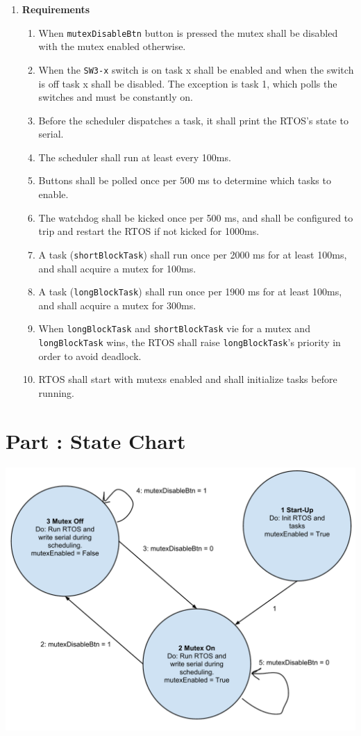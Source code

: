 \documentclass{article}
\newcounter{partNum}
\newcommand{\partNum}{%
        \stepcounter{partNum}%
        \thepartNum}
\newcommand{\sectPart}[1]{\section*{Part \partNum: #1}}
\newcommand{\bitem}[1]{\item \textbf{#1}}
\begin{document}
\begin{enumerate}
\bitem{Requirements}
	\begin{enumerate}
	\item When \texttt{mutexDisableBtn} button is pressed the mutex shall be disabled with the mutex enabled otherwise.
	\item When the \texttt{SW3-x} switch is on task x shall be enabled and when the switch is off task x shall be disabled. The exception is task 1, which polls the switches and must be constantly on.
	\item Before the scheduler dispatches a task, it shall print the RTOS's state to serial.
	\item The scheduler shall run at least every 100ms.
	\item Buttons shall be polled once per 500 ms to determine which tasks to enable.
	\item The watchdog shall be kicked once per 500 ms, and shall be configured to trip and restart the RTOS if not kicked for 1000ms.
	\item A task (\texttt{shortBlockTask}) shall run once per 2000 ms for at least 100ms, and shall acquire a mutex for 100ms.
	\item A task (\texttt{longBlockTask}) shall run once per 1900 ms for at least 100ms, and shall acquire a mutex for 300ms.
	\item When \texttt{longBlockTask} and \texttt{shortBlockTask} vie for a mutex and \texttt{longBlockTask} wins, the RTOS shall raise \texttt{longBlockTask}'s priority in order to avoid deadlock.
	\item RTOS shall start with mutexs enabled and shall initialize tasks before running.
	\end{enumerate}
\end{enumerate}


\sectPart{State Chart}

\begin{center}
    \includegraphics[scale=.5]{RTOS_State_Chart.pdf}
\end{center}
\end{document}
